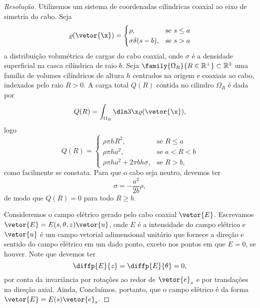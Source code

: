 \begin{proof}[Resolução]
    Utilizemos um sistema de coordenadas cilíndricas coaxial ao eixo de simetria do cabo. Seja
    \begin{equation*}
        \varrho(\vetor{\x}) = \begin{cases}
            \rho,&\text{se }s \leq a\\
            \sigma \delta(s - b),&\text{se }s > a
        \end{cases}
    \end{equation*}
    a distribuição volumétrica de cargas do cabo coaxial, onde \(\sigma\) é a densidade superficial na casca cilíndrica de raio \(b\). Seja \(\family{\Omega_R}{R \in \mathbb{R}^+} \subset \mathbb{R}^3\) uma família de volumes cilíndricos de altura \(h\) centrados na origem e coaxiais ao cabo, indexados pelo raio \(R > 0\). A carga total \(Q(R)\) contida no cilindro \(\Omega_R\) é dada por
    \begin{align*}
        Q(R) = \int_{\Omega_R}\dln3\x \varrho(\vetor{\x}),
    \end{align*}
    logo
    \begin{equation*}
        Q(R) = \begin{cases}
            \rho \pi h R^2, &\text{se }R \leq a\\
            \rho \pi h a^2, &\text{se }a < R < b\\
            \rho \pi h a^2 + 2 \pi b h\sigma, &\text{se }R > b,
        \end{cases}
    \end{equation*}
    como facilmente se constata. Para que o cabo seja neutro, devemos ter
    \begin{equation*}
        \sigma = -\frac{a^2}{2b}\rho,
    \end{equation*}
    de modo que \(Q(R) = 0\) para todo \(R \geq b\).

    Consideremos o campo elétrico gerado pelo cabo coaxial \(\vetor{E}\). Escrevamos \(\vetor{E} = E(s, \theta, z)\vetor{u}\), onde \(E\) é a intensidade do campo elétrico e \(\vetor{u}\) é um campo vetorial adimensional unitário que fornece a direção e sentido do campo elétrico em um dado ponto, exceto nos pontos em que \(E = 0\), se houver. Note que devemos ter
    \begin{equation*}
        \diffp{E}{z} = \diffp{E}{\theta} = 0,
    \end{equation*}
    por conta da invariância por rotações ao redor de \(\vetor{e}_z\) e por translações na direção axial. Ainda, \todo[é necessário que \(\vetor{u} = \vetor{e}_s\) em todo ponto, por conta da simetria cilíndrica.] Concluímos, portanto, que o campo elétrico é da forma \(\vetor{E} = E(s) \vetor{e}_s\).


\end{proof}
